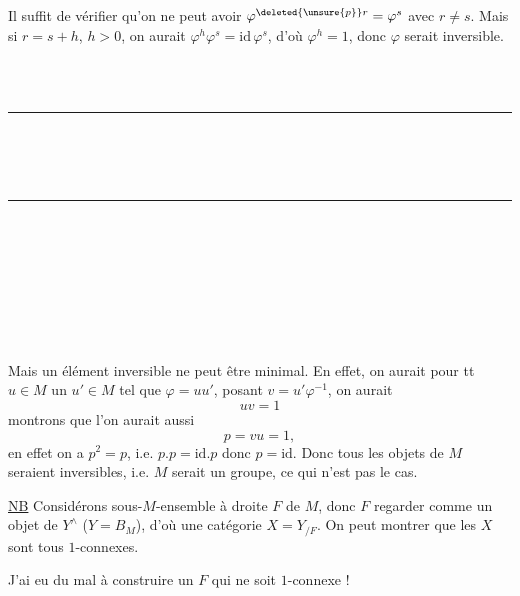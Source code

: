 Il suffit de vérifier qu'on ne peut avoir $\varphi^{\deleted{\unsure{p}}r}=\varphi^s$ avec $r\ne s$. Mais si $r=s+h$, $h>0$, on aurait $\varphi^h\varphi^s=\mathrm{id}\,\varphi^s$, d'où $\varphi^h=1$, donc $\varphi$ serait inversible.
\par\smallskip
{\footnotesize\noindent\begin{minipage}[t]{.46\linewidth}\raggedright
{}\\ \\ \rule{2.6em}{.3pt}\\ \\ \\ \rule{2.6em}{.3pt}\\ \\ 
\end{minipage}\hfill%
\begin{minipage}[t]{.51\linewidth}\raggedright
{}\\ \\ \\ \\ 
\end{minipage}\par}


Mais un élément inversible ne peut être minimal. En effet, on aurait pour tt $u\in M$ un $u'\in M$ tel que $\varphi=uu'$,   posant $v=u'\varphi^{-1}$, on aurait
\[
uv=1
\]
montrons que l'on aurait aussi
\[
p=vu=1,
\]
en effet on a $p^2=p$, i.e. $p.p=\mathrm{id}.p$ donc $p=\mathrm{id}$. Donc tous les objets de $M$ seraient inversibles, i.e. $M$ serait un groupe, ce qui n'est pas le cas.

\uline{NB} Considérons   sous-$M$-ensemble à droite $F$ de $M$, donc $F$  regarder comme un objet de $Y^\wedge$ ($Y=B_M$), d'où une catégorie $X=Y_{/F}$. On peut montrer que les $X$ sont tous $1$-connexes.

J'ai eu du mal à construire un $F$  qui ne soit $1$-connexe !

